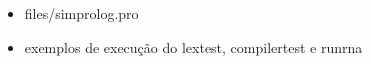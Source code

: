 
\begin{itemize}
	\item files/simprolog.pro
	\item exemplos de execução do lextest, compilertest e runrna
\end{itemize}
